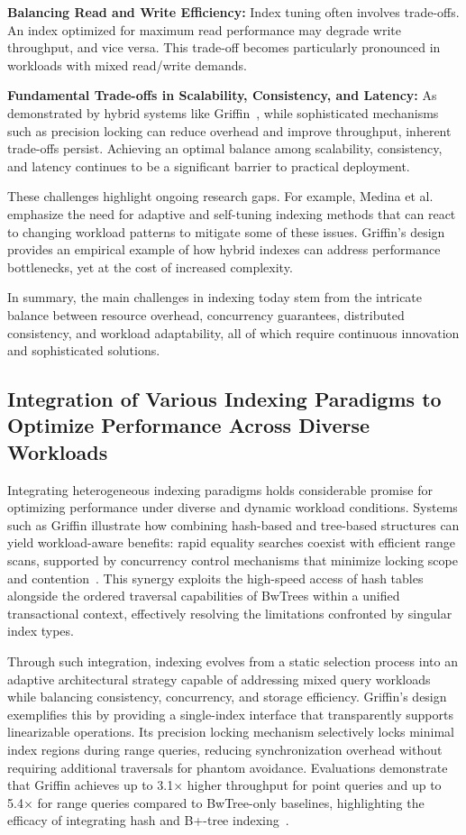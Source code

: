 \documentclass[sigconf]{acmart}
\begin{document}
\textbf{Balancing Read and Write Efficiency:} Index tuning often involves trade-offs. An index optimized for maximum read performance may degrade write throughput, and vice versa. This trade-off becomes particularly pronounced in workloads with mixed read/write demands.

\textbf{Fundamental Trade-offs in Scalability, Consistency, and Latency:} As demonstrated by hybrid systems like Griffin~\cite{ref35}, while sophisticated mechanisms such as precision locking can reduce overhead and improve throughput, inherent trade-offs persist. Achieving an optimal balance among scalability, consistency, and latency continues to be a significant barrier to practical deployment.

These challenges highlight ongoing research gaps. For example, Medina et al.~\cite{ref31} emphasize the need for adaptive and self-tuning indexing methods that can react to changing workload patterns to mitigate some of these issues. Griffin's design \cite{ref35} provides an empirical example of how hybrid indexes can address performance bottlenecks, yet at the cost of increased complexity.

In summary, the main challenges in indexing today stem from the intricate balance between resource overhead, concurrency guarantees, distributed consistency, and workload adaptability, all of which require continuous innovation and sophisticated solutions.

\subsection{Integration of Various Indexing Paradigms to Optimize Performance Across Diverse Workloads}

Integrating heterogeneous indexing paradigms holds considerable promise for optimizing performance under diverse and dynamic workload conditions. Systems such as Griffin illustrate how combining hash-based and tree-based structures can yield workload-aware benefits: rapid equality searches coexist with efficient range scans, supported by concurrency control mechanisms that minimize locking scope and contention~\cite{ref35}. This synergy exploits the high-speed access of hash tables alongside the ordered traversal capabilities of BwTrees within a unified transactional context, effectively resolving the limitations confronted by singular index types.

Through such integration, indexing evolves from a static selection process into an adaptive architectural strategy capable of addressing mixed query workloads while balancing consistency, concurrency, and storage efficiency. Griffin’s design exemplifies this by providing a single-index interface that transparently supports linearizable operations. Its precision locking mechanism selectively locks minimal index regions during range queries, reducing synchronization overhead without requiring additional traversals for phantom avoidance. Evaluations demonstrate that Griffin achieves up to 3.1$\times$ higher throughput for point queries and up to 5.4$\times$ for range queries compared to BwTree-only baselines, highlighting the efficacy of integrating hash and B+-tree indexing~\cite{ref35}.
\end{document}
